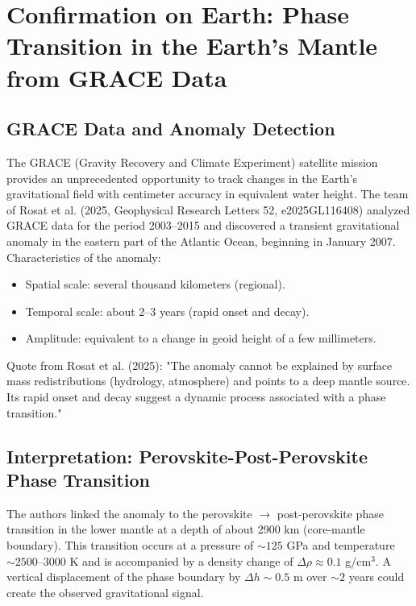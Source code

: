\documentclass[12pt]{article}
\theoremstyle{remark}
\begin{document}
	\section{Confirmation on Earth: Phase Transition in the Earth's Mantle from GRACE Data}
	\label{sec:grace}
	
	\subsection{GRACE Data and Anomaly Detection}
	\label{subsec:grace-data}
	
	The GRACE (Gravity Recovery and Climate Experiment) satellite mission provides an unprecedented opportunity to track changes in the Earth's gravitational field with centimeter accuracy in equivalent water height. The team of Rosat et al. (2025, Geophysical Research Letters 52, e2025GL116408) analyzed GRACE data for the period 2003–2015 and discovered a transient gravitational anomaly in the eastern part of the Atlantic Ocean, beginning in January 2007. Characteristics of the anomaly:
	\begin{itemize}
		\item Spatial scale: several thousand kilometers (regional).
		\item Temporal scale: about 2–3 years (rapid onset and decay).
		\item Amplitude: equivalent to a change in geoid height of a few millimeters.
	\end{itemize}
	Quote from Rosat et al. (2025): "The anomaly cannot be explained by surface mass redistributions (hydrology, atmosphere) and points to a deep mantle source. Its rapid onset and decay suggest a dynamic process associated with a phase transition."
	
	\subsection{Interpretation: Perovskite-Post-Perovskite Phase Transition}
	\label{subsec:grace-interpretation}
	
	The authors linked the anomaly to the perovskite $\rightarrow$ post-perovskite phase transition in the lower mantle at a depth of about 2900 km (core-mantle boundary). This transition occurs at a pressure of $\sim 125$ GPa and temperature $\sim 2500$–$3000$ K and is accompanied by a density change of $\Delta\rho \approx 0.1$ g/cm$^3$. A vertical displacement of the phase boundary by $\Delta h \sim 0.5$ m over $\sim 2$ years could create the observed gravitational signal.
	
\end{document}
